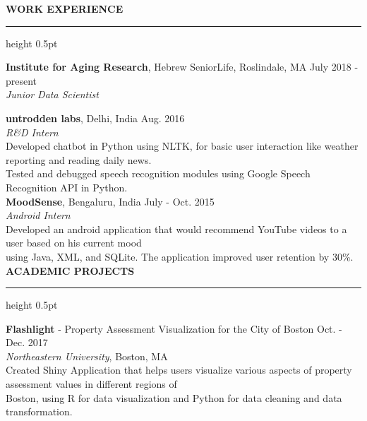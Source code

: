 \documentclass[a4paper]{article}
\newcommand{\myline}{\par
  \kern2pt %
  \hrule height 0.5pt
  \kern2pt %
}
\newcommand{\mybullet}{
	\indent \textbullet \hspace*{2mm}
}
\begin{document}
	\smallskip
	\smallskip
	\noindent
	{\large \textbf{WORK EXPERIENCE}}
	\myline 
	\smallskip
	
  \noindent
  \textbf{Institute for Aging Research}, Hebrew SeniorLife, Roslindale, MA 
  \hfill July 2018 - present\\
        \textit{Junior Data Scientist}\\
        \mybullet %

	\noindent
	\textbf{untrodden labs}, Delhi, India \hfill Aug. 2016 \\
        \textit{R\&D Intern}\\
        \mybullet Developed chatbot in Python using NLTK, for basic user interaction like 
        weather reporting and reading daily news. \\
	\mybullet Tested and debugged speech recognition modules using Google Speech 
        Recognition API in Python. \\
	
	\noindent
	\textbf{MoodSense}, Bengaluru, India \hfill July - Oct. 2015 \\
	\textit{Android Intern} \\
	\mybullet Developed an android application that would recommend YouTube videos to a 
        user based on his current mood \\
        \hspace*{9mm} using Java, XML, and SQLite. The 
        application improved user retention by 30\%. \\ 
	
        \noindent
	{\large \textbf{ACADEMIC PROJECTS}}
	\myline 
	\smallskip


        \noindent
        \textbf{Flashlight} - Property Assessment Visualization for the City of Boston 
        \hfill Oct. - Dec. 2017 \\
        \textit{Northeastern University}, Boston, MA \\
        \mybullet Created Shiny Application that helps users visualize various aspects of 
        property assessment values in different regions of \\ \hspace*{9mm} Boston, using 
        R for data visualization and Python for data cleaning and data transformation. \\
        
\end{document}
